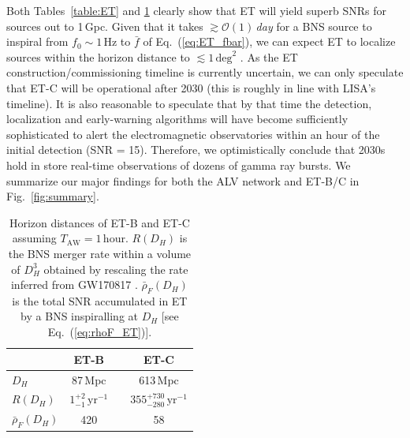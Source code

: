 \documentclass[amsmath,amssymb,aps,floats,amsfonts,notitlepage,superscriptaddress,eqsecnum,nofootinbib,10pt]{revtex4-1}
\newcommand\T{\rule{0pt}{2.6ex}}       %
\newcommand\B{\rule[-1.2ex]{0pt}{0pt}} %
\begin{document}
Both Tables~\ref{table:ET} and \ref{table:horizon} clearly show that ET will yield superb SNRs for sources out to 1\,Gpc. Given that
it takes $\gtrsim \mathcal{O}(1)\,$\emph{day} for a BNS source to inspiral from $f_0\sim 1\,$Hz to $\bar{f}$ of Eq.~(\ref{eq:ET_fbar}),
we can expect ET to localize sources within the horizon distance to $\lesssim 1\,\text{deg}^2$ \cite{Mills:2017urp}.
As the ET construction/commissioning timeline is currently uncertain, we can only speculate that ET-C will be operational after 2030 
(this is roughly in line with LISA's timeline).
It is also reasonable to speculate that by that time the detection, localization and early-warning algorithms will have become sufficiently sophisticated
to alert the electromagnetic observatories within an hour of the initial detection (SNR = 15). 
Therefore, we optimistically conclude that 2030s hold in store real-time observations of dozens of gamma ray bursts.
We summarize our major findings for both the ALV network and ET-B/C in Fig.~\ref{fig:summary}.
%
%
%
\begin{table}[h]
\centering
\begin{tabular}{l|ccc}
\hline
 & ET-B & & ET-C\T\B\\
\hline
  $D_H $& 87\,Mpc& &{613\,Mpc}\T\\
  $R(D_H) $& $1^{+2}_{-1}\,\text{yr}^{-1}$&\hspace{5mm} &{$355^{+730}_{-280}\,\text{yr}^{-1}$}\T\\
  $\bar\rho_F(D_H)$ & 420 &&{58}\T\B\\
\hline
\end{tabular}
\caption{Horizon distances of ET-B and ET-C assuming $T_\text{AW} =1\,$hour. $R(D_H)$ is the BNS merger rate within a volume of $D_H^3$
obtained by rescaling the rate inferred from GW170817 \cite{GW170817}. $\bar\rho_F(D_H)$ is the total SNR accumulated in ET by a BNS inspiralling at $D_H$ [see Eq.~(\ref{eq:rhoF_ET})].}\label{table:horizon}
\end{table}
%
%
%
\end{document}
